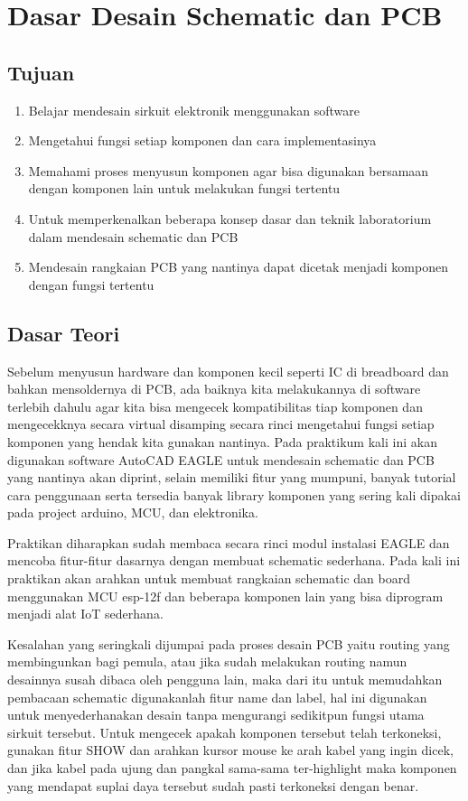 \chapter{Dasar Desain Schematic dan PCB}

\section{Tujuan}
\begin{enumerate}
    \item Belajar mendesain sirkuit elektronik menggunakan software
    \item Mengetahui fungsi setiap komponen dan cara implementasinya
    \item Memahami proses menyusun komponen agar bisa digunakan bersamaan dengan komponen lain untuk melakukan fungsi tertentu
    \item Untuk memperkenalkan beberapa konsep dasar dan teknik laboratorium dalam mendesain schematic dan PCB
    \item Mendesain rangkaian PCB yang nantinya dapat dicetak menjadi komponen dengan fungsi tertentu
\end{enumerate}


\section{Dasar Teori}
Sebelum menyusun hardware dan komponen kecil seperti IC di breadboard dan
bahkan mensoldernya di PCB, ada baiknya kita melakukannya di software terlebih dahulu agar
kita bisa mengecek kompatibilitas tiap komponen dan mengecekknya secara virtual
disamping secara rinci mengetahui fungsi setiap komponen yang hendak kita gunakan
nantinya. Pada praktikum kali ini akan digunakan software AutoCAD EAGLE untuk mendesain
schematic dan PCB yang nantinya akan diprint, selain memiliki fitur yang mumpuni, banyak
tutorial cara penggunaan serta tersedia banyak library komponen yang sering kali dipakai
pada project arduino, MCU, dan elektronika.

Praktikan diharapkan sudah membaca secara rinci modul instalasi EAGLE dan mencoba fitur-fitur dasarnya dengan membuat schematic sederhana. Pada kali ini praktikan
akan arahkan untuk membuat rangkaian schematic dan board menggunakan MCU esp-12f
dan beberapa komponen lain yang bisa diprogram menjadi alat IoT sederhana.

Kesalahan yang seringkali dijumpai pada proses desain PCB yaitu routing yang
membingunkan bagi pemula, atau jika sudah melakukan routing namun desainnya susah
dibaca oleh pengguna lain, maka dari itu untuk memudahkan pembacaan schematic
digunakanlah fitur name dan label, hal ini digunakan untuk menyederhanakan desain tanpa
mengurangi sedikitpun fungsi utama sirkuit tersebut. Untuk mengecek apakah komponen
tersebut telah terkoneksi, gunakan fitur SHOW dan arahkan kursor mouse ke arah kabel yang
ingin dicek, dan jika kabel pada ujung dan pangkal sama-sama ter-highlight maka komponen
yang mendapat suplai daya tersebut sudah pasti terkoneksi dengan benar.

